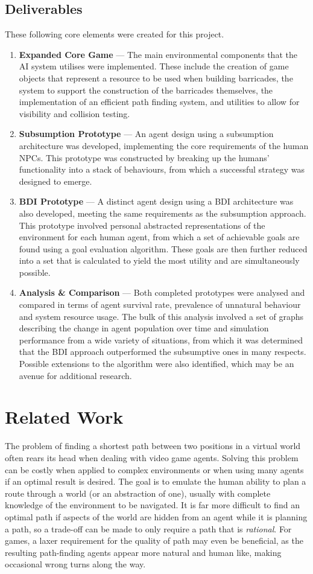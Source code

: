 \documentclass[12pt,a4paper]{article}
\newcommand{\deliverable}[2]{\item \textbf{#1} --- #2}
\begin{document}
\subsection{Deliverables}\noindent
These following core elements were created for this project.

\begin{enumerate}
  \deliverable{Expanded Core Game}
  {The main environmental components that the AI system utilises were implemented. These include the creation of game objects that represent a resource to be used when building barricades, the system to support the construction of the barricades themselves, the implementation of an efficient path finding system, and utilities to allow for visibility and collision testing.}

  \deliverable{Subsumption Prototype}
  {An agent design using a subsumption architecture was developed, implementing the core requirements of the human NPCs. This prototype was constructed by breaking up the humans' functionality into a stack of behaviours, from which a successful strategy was designed to emerge.}

  \deliverable{BDI Prototype}
  {A distinct agent design using a BDI architecture was also developed, meeting the same requirements as the subsumption approach. This prototype involved personal abstracted representations of the environment for each human agent, from which a set of achievable goals are found using a goal evaluation algorithm. These goals are then further reduced into a set that is calculated to yield the most utility and are simultaneously possible.}

  \deliverable{Analysis \& Comparison}
  {Both completed prototypes were analysed and compared in terms of agent survival rate, prevalence of unnatural behaviour and system resource usage. The bulk of this analysis involved a set of graphs describing the change in agent population over time and simulation performance from a wide variety of situations, from which it was determined that the BDI approach outperformed the subsumptive ones in many respects. Possible extensions to the algorithm were also identified, which may be an avenue for additional research.}
\end{enumerate}

\section{Related Work}
The problem of finding a shortest path between two positions in a virtual world often rears its head when dealing with video game agents. Solving this problem can be costly when applied to complex environments or when using many agents if an optimal result is desired. The goal is to emulate the human ability to plan a route through a world (or an abstraction of one), usually with complete knowledge of the environment to be navigated. It is far more difficult to find an optimal path if aspects of the world are hidden from an agent while it is planning a path, so a trade-off can be made to only require a path that is \emph{rational}. For games, a laxer requirement for the quality of path may even be beneficial, as the resulting path-finding agents appear more natural and human like, making occasional wrong turns along the way.
\end{document}
